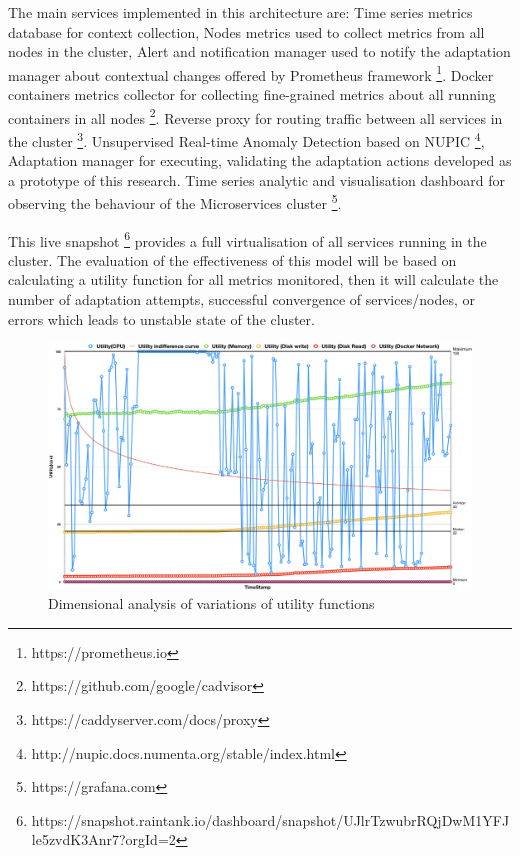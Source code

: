 \documentclass[graybox]{svmult}
\begin{document}
The main services implemented in this architecture are: Time series metrics database for context collection, Nodes metrics used to collect metrics from all nodes in the cluster, Alert and notification manager used to notify the adaptation manager about contextual changes offered by  Prometheus framework \footnote{https://prometheus.io}. Docker containers metrics collector for collecting fine-grained metrics about all running containers in all nodes \footnote{https://github.com/google/cadvisor}. Reverse proxy for routing traffic between all services in the cluster \footnote{https://caddyserver.com/docs/proxy}. Unsupervised Real-time Anomaly Detection based on NUPIC \footnote{http://nupic.docs.numenta.org/stable/index.html}, Adaptation manager for executing, validating the adaptation actions developed as a prototype of this research. Time series analytic and visualisation dashboard for observing the behaviour of the Microservices cluster \footnote{https://grafana.com}. 

This live snapshot \footnote{https://snapshot.raintank.io/dashboard/snapshot/UJlrTzwubrRQjDwM1YFJle5zvdK3Anr7?orgId=2} provides a full virtualisation of all services running in the cluster. The evaluation of the effectiveness of this model will be based on calculating a utility function for all metrics monitored, then it will calculate the number of adaptation attempts, successful convergence of services/nodes, or errors which leads to unstable state of the cluster. 

\begin{figure}[!ht] 
\centering
\includegraphics[scale=0.17]{demand}
\caption{ Dimensional analysis of variations of utility functions}
\label{fig_demand}
\end{figure}
\end{document}
